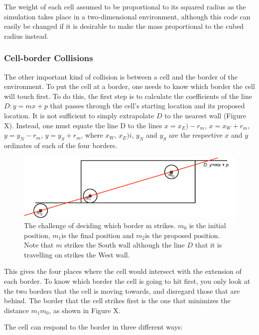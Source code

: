 \documentclass[12pt]{article}
\begin{document}
The weight of each cell assumed to be proportional to its squared radius 
as the simulation takes place in a two-dimensional environment, although 
this code can easily be changed if it is desirable to make the mass 
proportional to the cubed radius instead.

\subsubsection{Cell-border Collisions}
The other important kind of collision is between a cell and the border 
of the environment. To put the cell at a border, one needs to know which 
border the cell will touch first. To do this, the first step is to 
calculate the coefficients of the line \(D: y=mx + p\) that passes through 
the cell's starting location and its proposed location. It is not 
sufficient to simply extrapolate \(D\) to the nearest wall (Figure X). 
Instead, one must equate the line D to the lines 
\(x = x_E) - r_m\), \(x = x_W + r_m\), \(y = y_N - r_m\), \(y = y_S + r_m\), 
where \(x_W\), \(x_E)i\), \(y_N\) and \(y_S\) are the respective \(x\) 
and \(y\) ordinates of each of the four borders.

\begin{figure}[H]
\centering
\includegraphics[width=12.98cm]{media/wall.png}
\caption{The challenge of deciding which border m 
  strikes. \(m_0\) is the initial position, \(m_1\)is the final 
  position and \(m_2\)is the proposed position. Note that \(m\) strikes 
  the South wall although the line \(D\) that it is travelling on strikes the 
West wall.}
\end{figure}

This gives the four places where the cell would intersect with the 
extension of each border. To know which border the cell is going to hit 
first, you only look at the two borders that the cell is moving towards, 
and disregard those that are behind. The border that the cell strikes 
first is the one that minimizes the distance \(m_1m_0\), as 
shown in Figure X. 

The cell can respond to the border in three different ways: 
\end{document}
